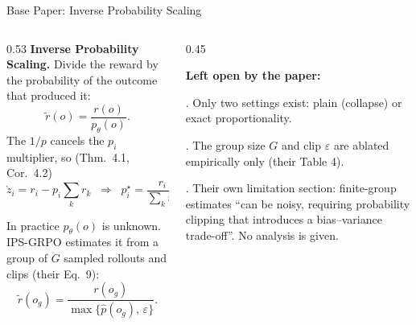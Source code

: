 \documentclass[aspectratio=169,10pt]{beamer}
\begin{document}
\begin{frame}{Base Paper: Inverse Probability Scaling}

\begin{columns}[T,onlytextwidth]
\begin{column}{0.53\textwidth}
\footnotesize
\textbf{Inverse Probability Scaling.} Divide the reward by the probability of the
outcome that produced it:
\[
  \tilde r(o) = \frac{r(o)}{p_\theta(o)} .
\]
The $1/p$ cancels the $p_i$ multiplier, so (Thm.~4.1, Cor.~4.2)
\[
  \dot z_i = r_i - p_i\!\sum_k r_k
  \;\;\Longrightarrow\;\;
  p_i^\star=\frac{r_i}{\sum_k r_k}.
\]

\medskip
In practice $p_\theta(o)$ is unknown. IPS-GRPO estimates it from a group of $G$
sampled rollouts and clips (their Eq.~9):
\[
  \tilde r(o_g)=\frac{r(o_g)}{\max\{\hat p(o_g),\,\varepsilon\}} .
\]
\end{column}

\begin{column}{0.45\textwidth}
\centering
\vspace{1mm}

\vspace{4mm}
{\scriptsize\raggedright
\textbf{Left open by the paper:}\par
{}. Only two settings exist: plain (collapse) or exact proportionality.\par
{}. The group size $G$ and clip $\varepsilon$ are ablated empirically only
(their Table 4).\par
{}. Their own limitation section: finite-group estimates ``can be noisy,
requiring probability clipping that introduces a bias--variance trade-off''.
No analysis is given.\par}
\end{column}
\end{columns}
\end{frame}
\end{document}
